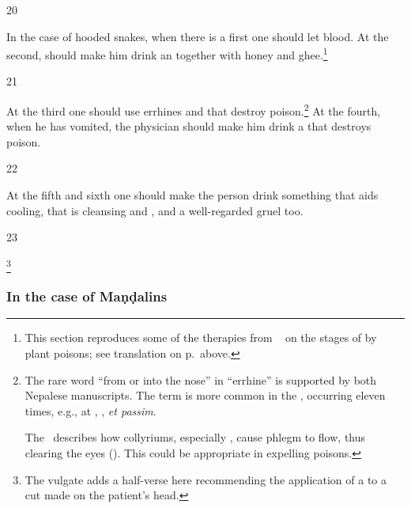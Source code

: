 \begin{translation}
\item [20]

In the case of hooded snakes, when there is a 
first one should let blood.  At the second,  should make him drink an 
 together with honey and ghee.\footnote{This
    section reproduces some of the therapies from  \SS\ 
    on the stages of  by plant poisons; see
    translation on p.\,\pageref{dusivisa} above.}

\item [21]

At the third one should use errhines and  that destroy
poison.\footnote{%
The rare word  “from or
    into the nose” in  “errhine” is supported by both
    Nepalese manuscripts.  The term is more common in the \CS, occurring
    eleven times, e.g., at , , \emph{et
    passim}.  
    
    The \CS\ describes how collyriums, especially , cause
phlegm to flow, thus clearing the eyes ().
This could be appropriate in expelling poisons.} At the fourth, when he
has vomited, the physician should make him drink a 
that destroys poison.

\item [22]

At the fifth and sixth  one should make the
person drink something that aids cooling, that is cleansing
and , and a well-regarded gruel too.

    
\item [23]

\footnote{The vulgate adds a half-verse here recommending
    the application of a  to a cut made on the patient's 
    head.}


\subsubsection{In the case of Maṇḍalins}


\end{translation}
